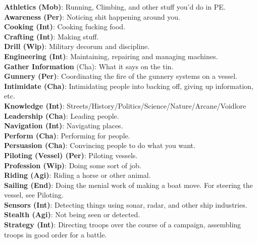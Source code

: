 \documentclass[a4paper, twocolumn, openany]{book}
\begin{document}
{\noindent
{\bfseries Athletics (Mob)}: Running, Climbing, and other stuff you’d do in PE.\\
{\bfseries Awareness (Per)}: Noticing shit happening around you.\\
{\bfseries Cooking (Int)}: Cooking fucking food.\\
{\bfseries Crafting (Int)}: Making stuff.\\
{\bfseries Drill (Wip)}: Military decorum and discipline.\\
{\bfseries Engineering (Int)}: Maintaining, repairing and managing machines.\\
{\bfseries Gather Information }(Cha): What it says on the tin.\\
{\bfseries Gunnery (Per)}: Coordinating the fire of the gunnery systems on a vessel.\\
{\bfseries Intimidate (Cha)}: Intimidating people into backing off, giving up information, etc.\\
{\bfseries Knowledge (Int)}: Streets/\linebreak[0]History/\linebreak[0]Politics/\linebreak[0]Science/\linebreak[0]Nature/\linebreak[0]Arcane/\linebreak[0]Voidlore\\
{\bfseries Leadership (Cha)}: Leading people.\\
{\bfseries Navigation (Int)}: Navigating places.\\
{\bfseries Perform (Cha)}: Performing for people.\\
{\bfseries Persuasion (Cha)}: Convincing people to do what you want.\\
{\bfseries Piloting (Vessel) (Per)}: Piloting vessels.\\
{\bfseries Profession (Wip)}: Doing some sort of job.\\
{\bfseries Riding (Agi)}: Riding a horse or other animal.\\
{\bfseries Sailing (End)}: Doing the menial work of making a boat move. For steering the vessel, see Piloting.\\
{\bfseries Sensors (Int)}: Detecting things using sonar, radar, and other ship industries.\\
{\bfseries Stealth (Agi)}: Not being seen or detected.\\
{\bfseries Strategy (Int)}: Directing troops over the course of a campaign, assembling troops in good order for a battle.\\
}
\end{document}
